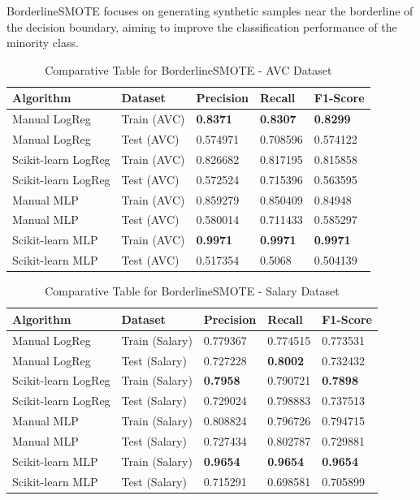 \documentclass[a4paper,12pt]{article}
\begin{document}
BorderlineSMOTE focuses on generating synthetic samples near the borderline of the decision boundary, aiming to improve the classification performance of the minority class.

\begin{table}[h!]
    \centering
    \caption{Comparative Table for BorderlineSMOTE - AVC Dataset}
    \begin{tabularx}{\textwidth}{|l|l|X|X|X|}
    \hline
    \textbf{Algorithm} & \textbf{Dataset} & \textbf{Precision} & \textbf{Recall} & \textbf{F1-Score} \\
    \hline
    Manual LogReg & Train (AVC) & \textbf{0.8371} & \textbf{0.8307} & \textbf{0.8299} \\
    Manual LogReg & Test (AVC) & 0.574971 & 0.708596 & 0.574122 \\
    Scikit-learn LogReg & Train (AVC) & 0.826682 & 0.817195 & 0.815858 \\
    Scikit-learn LogReg & Test (AVC) & 0.572524 & 0.715396 & 0.563595 \\
    Manual MLP & Train (AVC) & 0.859279 & 0.850409 & 0.84948 \\
    Manual MLP & Test (AVC) & 0.580014 & 0.711433 & 0.585297 \\
    Scikit-learn MLP & Train (AVC) & \textbf{0.9971} & \textbf{0.9971} & \textbf{0.9971} \\
    Scikit-learn MLP & Test (AVC) & 0.517354 & 0.5068 & 0.504139 \\
    \hline
    \end{tabularx}
\end{table}

\begin{table}[h!]
    \centering
    \caption{Comparative Table for BorderlineSMOTE - Salary Dataset}
    \begin{tabularx}{\textwidth}{|l|l|X|X|X|}
    \hline
    \textbf{Algorithm} & \textbf{Dataset} & \textbf{Precision} & \textbf{Recall} & \textbf{F1-Score} \\
    \hline
    Manual LogReg & Train (Salary) & 0.779367 & 0.774515 & 0.773531 \\
    Manual LogReg & Test (Salary) & 0.727228 & \textbf{0.8002} & 0.732432 \\
    Scikit-learn LogReg & Train (Salary) & \textbf{0.7958} & 0.790721 & \textbf{0.7898} \\
    Scikit-learn LogReg & Test (Salary) & 0.729024 & 0.798883 & 0.737513 \\
    Manual MLP & Train (Salary) & 0.808824 & 0.796726 & 0.794715 \\
    Manual MLP & Test (Salary) & 0.727434 & 0.802787 & 0.729881 \\
    Scikit-learn MLP & Train (Salary) & \textbf{0.9654} & \textbf{0.9654} & \textbf{0.9654} \\
    Scikit-learn MLP & Test (Salary) & 0.715291 & 0.698581 & 0.705899 \\
    \hline
    \end{tabularx}
\end{table}
\end{document}
